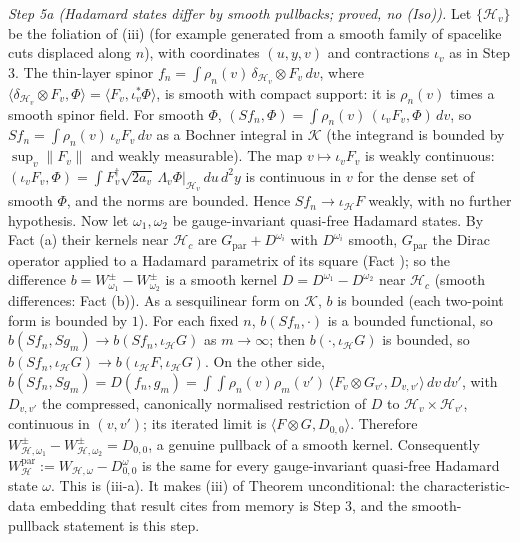 \emph{Step 5a (Hadamard states differ by smooth pullbacks; proved, no (Iso)).} Let $\{\mathcal{H}_{v}\}$ be the foliation of (iii) (for example generated from a smooth family of spacelike cuts displaced along $n$), with coordinates $(u, y, v)$ and contractions $\iota_{v}$ as in Step 3. The thin-layer spinor $f_{n} = \int\rho_{n}(v)\,\delta_{\mathcal{H}_{v}}\otimes F_{v}\,dv$, where $\langle\delta_{\mathcal{H}_{v}}\otimes F_{v}, \Phi\rangle = \langle F_{v}, \iota_{v}^{*}\Phi\rangle$, is smooth with compact support: it is $\rho_{n}(v)$ times a smooth spinor field. For smooth $\Phi$, $(Sf_{n}, \Phi) = \int\rho_{n}(v)\,(\iota_{v}F_{v}, \Phi)\,dv$, so $Sf_{n} = \int\rho_{n}(v)\,\iota_{v}F_{v}\,dv$ as a Bochner integral in $\mathcal{K}$ (the integrand is bounded by $\sup_{v}\|F_{v}\|$ and weakly measurable). The map $v \mapsto \iota_{v}F_{v}$ is weakly continuous: $(\iota_{v}F_{v}, \Phi) = \int F_{v}^{\dagger}\sqrt{2a_{v}}\,\Lambda_{v}\Phi|_{\mathcal{H}_{v}}\,du\,d^{2}y$ is continuous in $v$ for the dense set of smooth $\Phi$, and the norms are bounded. Hence $Sf_{n} \to \iota_{\mathcal{H}}F$ weakly, with no further hypothesis. Now let $\omega_{1}, \omega_{2}$ be gauge-invariant quasi-free Hadamard states. By Fact (a) their kernels near $\mathcal{H}_{c}$ are $G_{\mathrm{par}} + D^{\omega_{i}}$ with $D^{\omega_{i}}$ smooth, $G_{\mathrm{par}}$ the Dirac operator applied to a Hadamard parametrix of its square (Fact ); so the difference $b = W^{\pm}_{\omega_{1}} - W^{\pm}_{\omega_{2}}$ is a smooth kernel $D = D^{\omega_{1}} - D^{\omega_{2}}$ near $\mathcal{H}_{c}$ (smooth differences: Fact (b)). As a sesquilinear form on $\mathcal{K}$, $b$ is bounded (each two-point form is bounded by $1$). For each fixed $n$, $b(Sf_{n}, \cdot)$ is a bounded functional, so $b(Sf_{n}, Sg_{m}) \to b(Sf_{n}, \iota_{\mathcal{H}}G)$ as $m \to \infty$; then $b(\cdot, \iota_{\mathcal{H}}G)$ is bounded, so $b(Sf_{n}, \iota_{\mathcal{H}}G) \to b(\iota_{\mathcal{H}}F, \iota_{\mathcal{H}}G)$. On the other side, $b(Sf_{n}, Sg_{m}) = D(f_{n}, g_{m}) = \int\!\!\int\rho_{n}(v)\rho_{m}(v')\,\langle F_{v}\otimes G_{v'}, D_{v,v'}\rangle\,dv\,dv'$, with $D_{v,v'}$ the compressed, canonically normalised restriction of $D$ to $\mathcal{H}_{v}\times\mathcal{H}_{v'}$, continuous in $(v, v')$; its iterated limit is $\langle F\otimes G, D_{0,0}\rangle$. Therefore $W^{\pm}_{\mathcal{H},\omega_{1}} - W^{\pm}_{\mathcal{H},\omega_{2}} = D_{0,0}$, a genuine pullback of a smooth kernel. Consequently $W^{\mathrm{par}}_{\mathcal{H}} := W_{\mathcal{H},\omega} - D^{\omega}_{0,0}$ is the same for every gauge-invariant quasi-free Hadamard state $\omega$. This is (iii-a). It makes (iii) of Theorem  unconditional: the characteristic-data embedding that result cites from memory is Step 3, and the smooth-pullback statement is this step.

